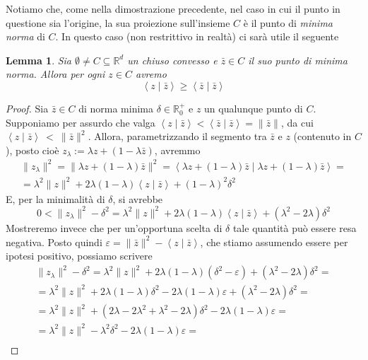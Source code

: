 \documentclass[a4paper,12pt,italian]{article}
\newcommand{\Rd}{\mathbb{R}^d}
\newtheorem{lem}{Lemma}
\begin{document}
Notiamo che, come nella dimostrazione precedente, nel caso in cui il punto in questione sia l'origine,
la sua proiezione sull'insieme $C$ \`e il punto di \emph{minima norma} di $C$. In questo caso 
(non restrittivo in realt\`a) ci sar\`a utile il seguente
\begin{lem}
\label{DisugMinimaNorma}
Sia $\emptyset\neq C\subseteq\Rd$ un chiuso convesso e $\bar{z}\in C$ il suo punto di minima norma. Allora per ogni $z\in C$ avremo
\begin{equation}
\left<z\mid\bar{z}\right>\geq\left<\bar{z}\mid\bar{z}\right>
\end{equation}
\end{lem}
\begin{proof}
Sia $\bar{z}\in C$ di norma minima $\delta\in\mathbb{R}^+_0$ e $z$ un qualunque punto di $C$. Supponiamo per assurdo che valga
$\left<z\mid\bar{z}\right><\left<\bar{z}\mid\bar{z}\right>=\|\bar{z}\|$, da cui $\left<z\mid\bar{z}\right>~<~\|\bar{z}\|^2$. Allora, parametrizzando
il segmento tra $\bar{z}$ e $z$ (contenuto in $C$), posto cio\`e $z_\lambda:=\lambda z+(1-\lambda\bar{z})$, avremmo
\begin{gather*}				%
\|z_\lambda\|^2=\|\lambda z + (1-\lambda)\bar{z}\|^2=\left<\lambda z + (1-\lambda)\bar{z}\mid\lambda z + (1-\lambda)\bar{z}\right>=\\
=\lambda^2\|z\|^2+2\lambda(1-\lambda)\left<z\mid\bar{z}\right>+(1-\lambda)^2\delta^2
\end{gather*}
E, per la minimalit\`a di $\delta$, si avrebbe
\begin{equation*}
0<\|z_\lambda\|^2-\delta^2=\lambda^2\|z\|^2+2\lambda(1-\lambda)\left<z\mid\bar{z}\right>+(\lambda^2-2\lambda)\delta^2
\end{equation*}
Mostreremo invece che per un'opportuna scelta di $\delta$ tale quantit\`a pu\`o essere resa negativa.
Posto quindi $\varepsilon=\|\bar{z}\|^2-\left<z\mid\bar{z}\right>$, che stiamo assumendo essere per ipotesi positivo, possiamo scrivere
\begin{gather*}
\|z_\lambda\|^2-\delta^2=\lambda^2\|z\|^2+2\lambda(1-\lambda)(\delta^2-\varepsilon)+(\lambda^2-2\lambda)\delta^2=\\
=\lambda^2\|z\|^2+2\lambda(1-\lambda)\delta^2-2\lambda(1-\lambda)\varepsilon+(\lambda^2-2\lambda)\delta^2=\\
=\lambda^2\|z\|^2+(2\lambda-2\lambda^2+\lambda^2-2\lambda)\delta^2-2\lambda(1-\lambda)\varepsilon=\\
=\lambda^2\|z\|^2-\lambda^2\delta^2-2\lambda(1-\lambda)\varepsilon=\\

\end{gather*}
\end{proof}
\end{document}
